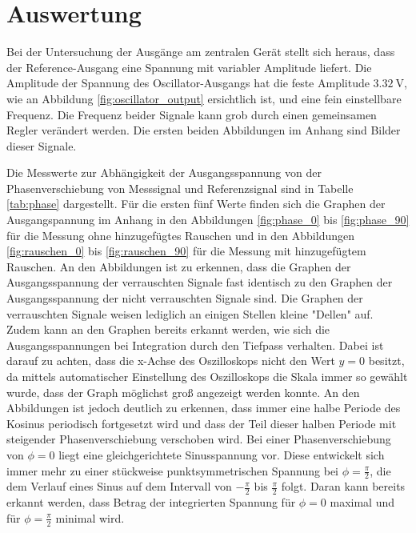 \section{Auswertung}
\label{sec:Auswertung}

Bei der Untersuchung der Ausgänge am zentralen Gerät stellt sich heraus, dass
der Reference-Ausgang eine Spannung mit variabler Amplitude liefert. Die Amplitude
der Spannung des Oscillator-Ausgangs hat die feste Amplitude $\SI{3,32}{\volt}$,
wie an Abbildung \ref{fig:oscillator_output} ersichtlich ist, und eine fein einstellbare
Frequenz. Die Frequenz beider Signale kann grob durch einen gemeinsamen Regler verändert
werden. Die ersten beiden Abbildungen im Anhang sind Bilder dieser Signale.

Die Messwerte zur Abhängigkeit der Ausgangsspannung von der Phasenverschiebung
von Messsignal und Referenzsignal sind in Tabelle \ref{tab:phase} dargestellt.
Für die ersten fünf Werte finden sich die Graphen der Ausgangspannung im Anhang in
den Abbildungen \ref{fig:phase_0} bis \ref{fig:phase_90} für die Messung ohne hinzugefügtes
Rauschen und in den Abbildungen \ref{fig:rauschen_0} bis \ref{fig:rauschen_90} für
die Messung mit hinzugefügtem Rauschen.
An den Abbildungen ist zu erkennen, dass die Graphen der Ausgangsspannung
der verrauschten Signale fast identisch zu den Graphen der Ausgangsspannung
der nicht verrauschten Signale sind. Die Graphen der verrauschten Signale
weisen lediglich an einigen Stellen kleine "Dellen" auf.
Zudem kann an den Graphen bereits erkannt werden, wie sich die Ausgangsspannungen
bei Integration durch den Tiefpass verhalten. Dabei ist darauf zu achten, dass
die x-Achse des Oszilloskops nicht den Wert $y=0$ besitzt, da mittels automatischer
Einstellung des Oszilloskops die Skala immer so gewählt wurde, dass der Graph möglichst
groß angezeigt werden konnte. An den Abbildungen ist jedoch deutlich zu erkennen,
dass immer eine halbe Periode des Kosinus periodisch fortgesetzt wird und dass
der Teil dieser halben Periode mit steigender Phasenverschiebung verschoben wird.
Bei einer Phasenverschiebung von $\phi=0$ liegt eine gleichgerichtete Sinusspannung vor.
Diese entwickelt sich immer mehr zu einer stückweise punktsymmetrischen Spannung bei
$\phi=\frac{\pi}{2}$, die dem Verlauf eines Sinus auf dem Intervall von $-\frac{\pi}{2}$
bis $\frac{\pi}{2}$ folgt. Daran kann bereits erkannt werden, dass Betrag der integrierten
Spannung für $\phi=0$ maximal und für $\phi=\frac{\pi}{2}$ minimal wird.

